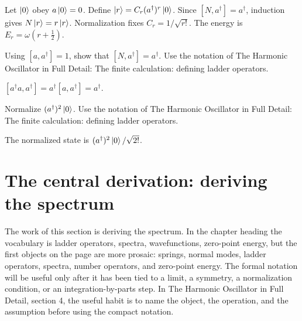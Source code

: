 \begin{example}
Let \(\left|0\right\rangle\) obey \(a\left|0\right\rangle=0\).  Define \(\left|r\right\rangle=C_r(a^\dagger)^r\left|0\right\rangle\).  Since \([N,a^\dagger]=a^\dagger\), induction gives \(N\left|r\right\rangle=r\left|r\right\rangle\).  Normalization fixes \(C_r=1/\sqrt{r!}\).  The energy is \(E_r=\omega(r+\frac12)\).
\end{example}



\begin{exercise}
Using \([a,a^\dagger]=1\), show that \([N,a^\dagger]=a^\dagger\).  Use the notation of The Harmonic Oscillator in Full Detail: The finite calculation: defining ladder operators.
\begin{answer}
\([a^\dagger a,a^\dagger]=a^\dagger[a,a^\dagger]=a^\dagger\).
\end{answer}
\end{exercise}

\begin{exercise}
Normalize \((a^\dagger)^2\left|0\right\rangle\).  Use the notation of The Harmonic Oscillator in Full Detail: The finite calculation: defining ladder operators.
\begin{answer}
The normalized state is \((a^\dagger)^2\left|0\right\rangle/\sqrt{2!}\).
\end{answer}
\end{exercise}



\section{The central derivation: deriving the spectrum}













The work of this section is deriving the spectrum.  In the chapter heading the vocabulary is ladder operators, spectra, wavefunctions, zero-point energy, but the first objects on the page are more prosaic: springs, normal modes, ladder operators, spectra, number operators, and zero-point energy.  The formal notation will be useful only after it has been tied to a limit, a symmetry, a normalization condition, or an integration-by-parts step.  In The Harmonic Oscillator in Full Detail, section 4, the useful habit is to name the object, the operation, and the assumption before using the compact notation.

